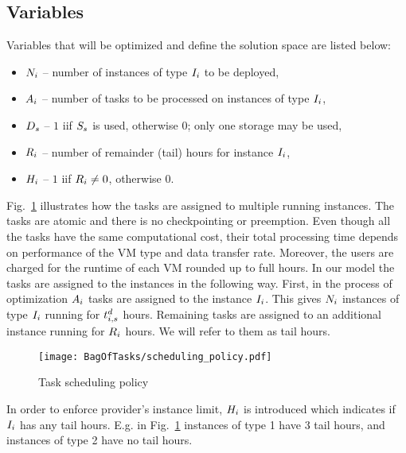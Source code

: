 {\subsection{Variables}
\label{sec:bot:varialbes}
  Variables that will be optimized and define the solution space are listed below:
  \begin{itemize}
      \item $N_i$ -- number of instances of type $I_i$
      to be deployed,
      \item $A_i$ -- number of tasks to be processed on
      instances of type $I_i$,
      \item $D_s$ -- $1$ iif $S_s$ is used, otherwise $0$; only one storage may be used,
      \item $R_i$ -- number of remainder (tail) hours for
      instance $I_i$,
      \item $H_i$ -- $1$ iif $R_i \neq 0$, otherwise $0$.
  \end{itemize}


  Fig.~\ref{fig:bot:policy} illustrates how the tasks are assigned to multiple running instances. The tasks are atomic and there is no checkpointing or preemption. Even though all the tasks have the same computational cost, their total processing time depends on performance of the VM type and data transfer rate. Moreover, the users are charged for the runtime of each VM rounded up to full hours. In our model the tasks are assigned to the instances in the following way. First, in the process of optimization $A_i$ tasks are assigned to the instance $I_i$. This gives $N_i$  instances of type $I_i$ running for $t^d_{i,s}$ hours. Remaining tasks are assigned to an additional instance running for $R_i$ hours. We will refer to them as tail hours.

  \begin{figure}[tb] 
     \centering
     \texttt{[image: BagOfTasks/scheduling\_policy.pdf]}
     \caption{\label{fig:bot:policy}Task scheduling policy}
  \end{figure}
    

  In order to enforce provider's instance limit, $H_i$ is introduced which indicates if $I_i$ has any tail hours. E.g. in Fig.~\ref{fig:bot:policy} instances of type 1 have 3 tail hours, and instances of type 2 have no tail hours.


}

